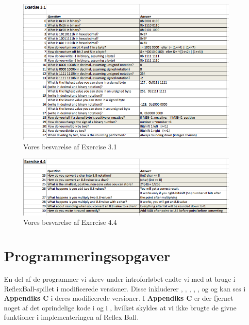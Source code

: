 \begin{figure}[h!]
\centering
\includegraphics[scale=0.6]{figs/Ex3.png}
\caption{Vores besvarelse af Exercise 3.1}
\label{fig:Ex3.1}
\end{figure}

\begin{figure}[h!]
\centering
\includegraphics[scale=0.6]{figs/Ex4.png}
\caption{Vores besvarelse af Exercise 4.4}
\label{fig:Ex4.4}
\end{figure}

\section{Programmeringsopgaver}
En del af de programmer vi skrev under introforløbet endte vi med at bruge i ReflexBall-spillet i modificerede versioner. Disse inkluderer , , , , ,  og  og kan ses i \textbf{Appendiks C} i deres modificerede versioner. I \textbf{Appendiks C} er der fjernet noget af det oprindelige kode i  og i , hvilket skyldes at vi ikke brugte de givne funktioner i implementeringen af Reflex Ball.